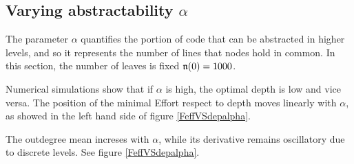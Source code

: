\subsection{Varying abstractability $\alpha$}
The parameter $\alpha$ quantifies the portion of code that can be abstracted in higher levels, and so it represents the number of lines that nodes hold in common. In this section, the number of leaves is fixed $\mathfrak n(0)=1000$.

Numerical simulations show that if $\alpha$ is high, the optimal depth is low and vice versa. The position of the minimal Effort respect to depth moves linearly with $\alpha$, as showed in the left hand side of figure \ref{FeffVSdepalpha}.

The outdegree mean increses with $\alpha$, while its derivative remains oscillatory due to discrete levels. See figure \ref{FeffVSdepalpha}.
%


